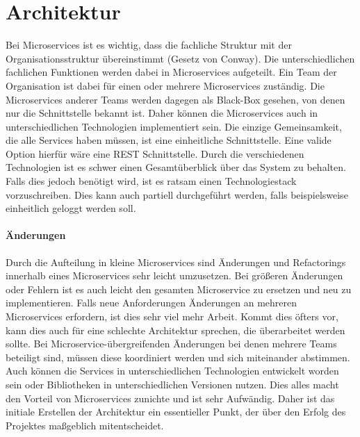 \section{Architektur} \label{ch:Architektur}
Bei Microservices ist es wichtig, dass die fachliche Struktur mit der Organisationsstruktur übereinstimmt (Gesetz von Conway). Die unterschiedlichen fachlichen Funktionen werden dabei in Microservices aufgeteilt. Ein Team der Organisation ist dabei für einen oder mehrere Microservices zuständig. Die Microservices anderer Teams werden dagegen als Black-Box gesehen, von denen nur die Schnittstelle bekannt ist. Daher können die Microservices auch in unterschiedlichen Technologien implementiert sein. Die einzige Gemeinsamkeit, die alle Services haben müssen, ist eine einheitliche Schnittstelle. Eine valide Option hierfür wäre eine REST Schnittstelle. \newline
Durch die verschiedenen Technologien ist es schwer einen Gesamtüberblick über das System zu behalten. Falls dies jedoch benötigt wird, ist es ratsam einen Technologiestack vorzuschreiben. Dies kann auch partiell durchgeführt werden, falls beispielsweise einheitlich geloggt werden soll. \paragraph{Änderungen}
Durch die Aufteilung in kleine Microservices sind Änderungen und Refactorings innerhalb eines Microservices sehr leicht umzusetzen. Bei größeren Änderungen oder Fehlern ist es auch leicht den gesamten Microservice zu ersetzen und neu zu implementieren. \newline
Falls neue Anforderungen Änderungen an mehreren Microservices erfordern, ist dies sehr viel mehr Arbeit. Kommt dies öfters vor, kann dies auch für eine schlechte Architektur sprechen, die überarbeitet werden sollte. Bei Microservice-übergreifenden Änderungen bei denen mehrere Teams beteiligt sind, müssen diese koordiniert werden und sich miteinander abstimmen. Auch können die Services in unterschiedlichen Technologien entwickelt worden sein oder Bibliotheken in unterschiedlichen Versionen nutzen. Dies alles macht den Vorteil von Microservices zunichte und ist sehr Aufwändig. Daher ist das initiale Erstellen der Architektur ein essentieller Punkt, der über den Erfolg des Projektes maßgeblich mitentscheidet.

